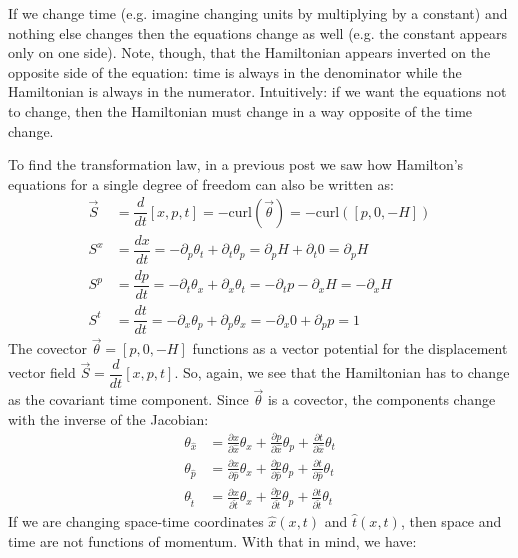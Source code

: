 \documentclass[aps,pra,10pt,floatfix,nofootinbib]{revtex4-1}
\theoremstyle{definition}
\begin{document}
If we change time (e.g. imagine changing units by multiplying by a constant) and nothing else changes then the equations change as well (e.g. the constant appears only on one side). Note, though, that the Hamiltonian appears inverted on the opposite side of the equation: time is always in the denominator while the Hamiltonian is always in the numerator. Intuitively: if we want the equations not to change, then the Hamiltonian must change in a way opposite of the time change.

To find the transformation law, in a previous post we saw how Hamilton's equations for a single degree of freedom can also be written as:
\begin{equation}
\begin{aligned}
\vec{S} &= \dfrac{d}{dt} [x, p, t] =  - \mathrm{curl}(\vec{\theta}) = - \mathrm{curl}([p, 0, -H]) \\
S^x &= \dfrac{dx}{dt} = - \partial_p \theta_t + \partial_t \theta_p = \partial_p H + \partial_t 0 = \partial_p H \\
S^p &= \dfrac{dp}{dt} = - \partial_t \theta_x + \partial_x \theta_t = -\partial_t p - \partial_x H = - \partial_x H \\
S^t &= \dfrac{dt}{dt} = - \partial_x \theta_p + \partial_p \theta_x = - \partial_x 0 + \partial_p p = 1
\end{aligned}
\label{HamiltonEquations}
\end{equation}
The covector $\vec{\theta}=[p, 0, -H]$ functions as a vector potential for the displacement vector field $\vec{S} = \dfrac{d}{dt} [x, p, t]$. So, again, we see that the Hamiltonian has to change as the covariant time component. Since $\vec{\theta}$ is a covector, the components change with the inverse of the Jacobian:
\begin{equation}
\begin{aligned}
\theta_{\hat{x}} &= \frac{\partial x}{\partial \hat{x}}\theta_x + \frac{\partial p}{\partial \hat{x}}\theta_p + \frac{\partial t}{\partial \hat{x}}\theta_t \\
\theta_{\hat{p}} &= \frac{\partial x}{\partial \hat{p}}\theta_x + \frac{\partial p}{\partial \hat{p}}\theta_p + \frac{\partial t}{\partial \hat{p}}\theta_t \\
\theta_{\hat{t}} &= \frac{\partial x}{\partial \hat{t}}\theta_x + \frac{\partial p}{\partial \hat{t}}\theta_p + \frac{\partial t}{\partial \hat{t}}\theta_t
\end{aligned}
\label{generalTransf}
\end{equation}
If we are changing space-time coordinates $\hat{x}(x,t)$ and $\hat{t}(x,t)$, then space and time are not functions of momentum. With that in mind, we have:
\end{document}
